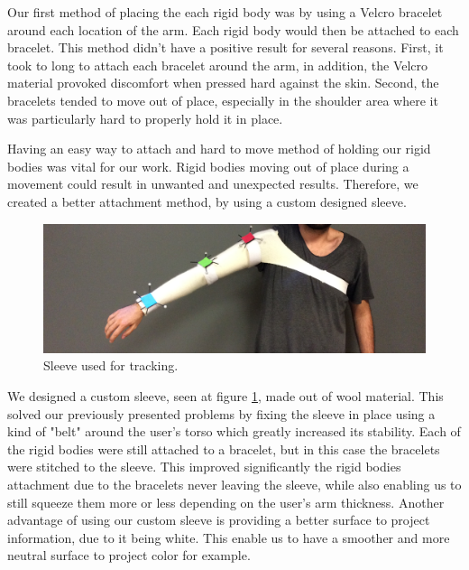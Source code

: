 Our first method of placing the each rigid body was by using a Velcro bracelet around each location of the arm. 
Each rigid body would then be attached to each bracelet. This method didn't have a positive result for several reasons. 
First, it took to long to attach each bracelet around the arm, in addition, the Velcro material provoked discomfort when pressed hard against the skin. 
Second, the bracelets tended to move out of place, especially in the shoulder area where it was particularly hard to properly hold it in place.

Having an easy way to attach and hard to move method of holding our rigid bodies was vital for our work. 
Rigid bodies moving out of place during a movement could result in unwanted and unexpected results. 
Therefore, we created a better attachment method, by using a custom designed sleeve.


\begin{figure}[!t]
    \begin{center}
        \includegraphics[width=\textwidth]{imgs/impl/sleevewearable.png}
    \end{center}
    \caption{Sleeve used for tracking.}
    \label{fig:sleevewearable}
\end{figure}

We designed a custom sleeve, seen at figure \ref{fig:sleevewearable}, made out of wool material. 
This solved our previously presented problems by fixing the sleeve in place using a kind of "belt" around the user's torso which greatly increased its stability. 
Each of the rigid bodies were still attached to a bracelet, but in this case the bracelets were stitched to the sleeve. 
This improved significantly the rigid bodies attachment due to the bracelets never leaving the sleeve, 
while also enabling us to still squeeze them more or less depending on the user's arm thickness.
Another advantage of using our custom sleeve is providing a better surface to project information, due to it being white. This enable us to have a smoother and more neutral surface to project color for example.  

